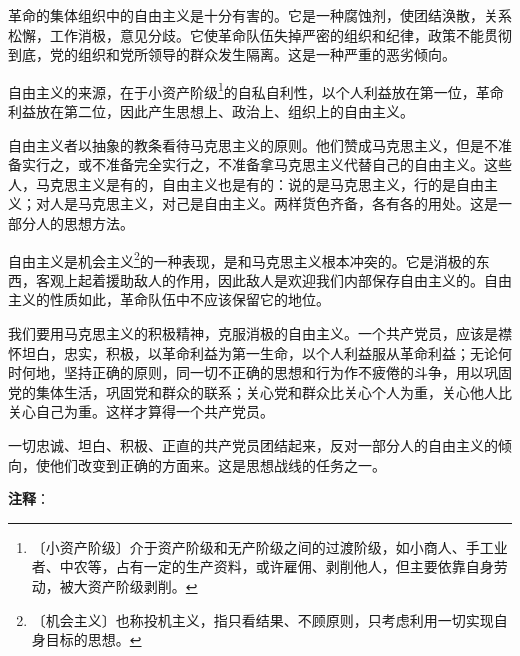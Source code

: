 \documentclass[12pt,UTF-8,openany]{ctexbook}
\begin{document}
\begin{normalsize}
    革命的集体组织中的自由主义是十分有害的。它是一种腐蚀剂，使团结涣散，关系松懈，工作消极，意见分歧。它使革命队伍失掉严密的组织和纪律，政策不能贯彻到底，党的组织和党所领导的群众发生隔离。这是一种严重的恶劣倾向。
    
    自由主义的来源，在于小资产阶级\footnote{〔小资产阶级〕介于资产阶级和无产阶级之间的过渡阶级，如小商人、手工业者、中农等，占有一定的生产资料，或许雇佣、剥削他人，但主要依靠自身劳动，被大资产阶级剥削。}的自私自利性，以个人利益放在第一位，革命利益放在第二位，因此产生思想上、政治上、组织上的自由主义。
    
    自由主义者以抽象的教条看待马克思主义的原则。他们赞成马克思主义，但是不准备实行之，或不准备完全实行之，不准备拿马克思主义代替自己的自由主义。这些人，马克思主义是有的，自由主义也是有的：说的是马克思主义，行的是自由主义；对人是马克思主义，对己是自由主义。两样货色齐备，各有各的用处。这是一部分人的思想方法。
    
    自由主义是机会主义\footnote{〔机会主义〕也称投机主义，指只看结果、不顾原则，只考虑利用一切实现自身目标的思想。}的一种表现，是和马克思主义根本冲突的。它是消极的东西，客观上起着援助敌人的作用，因此敌人是欢迎我们内部保存自由主义的。自由主义的性质如此，革命队伍中不应该保留它的地位。
    
    我们要用马克思主义的积极精神，克服消极的自由主义。一个共产党员，应该是襟怀坦白，忠实，积极，以革命利益为第一生命，以个人利益服从革命利益；无论何时何地，坚持正确的原则，同一切不正确的思想和行为作不疲倦的斗争，用以巩固党的集体生活，巩固党和群众的联系；关心党和群众比关心个人为重，关心他人比关心自己为重。这样才算得一个共产党员。
    
    一切忠诚、坦白、积极、正直的共产党员团结起来，反对一部分人的自由主义的倾向，使他们改变到正确的方面来。这是思想战线的任务之一。
    
\end{normalsize}


\newpage

\textbf{注释}：

\vspace{-1em}
\end{document}
